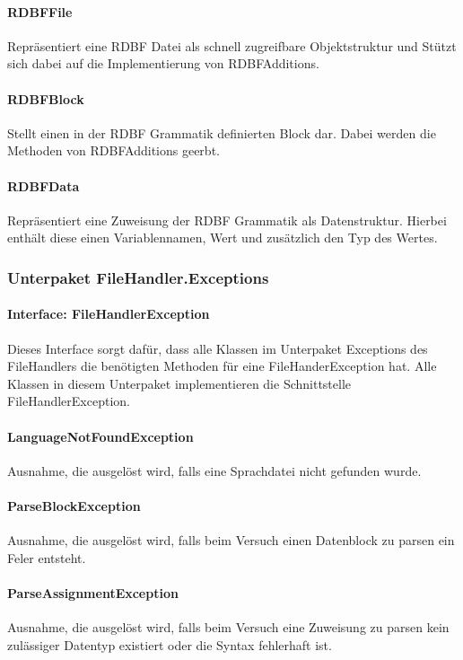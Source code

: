 \documentclass[parskip=full]{scrartcl}
\begin{document}
\paragraph{RDBFFile}
Repräsentiert eine RDBF Datei als schnell zugreifbare Objektstruktur und Stützt sich dabei auf die Implementierung von RDBFAdditions.
\paragraph{RDBFBlock}
Stellt einen in der RDBF Grammatik definierten Block dar. Dabei werden die Methoden von RDBFAdditions geerbt.
\paragraph{RDBFData}
Repräsentiert eine Zuweisung der RDBF Grammatik als Datenstruktur. Hierbei enthält diese einen Variablennamen, Wert und zusätzlich den Typ des Wertes.
\subsubsection{Unterpaket FileHandler.Exceptions}
\paragraph{Interface: FileHandlerException}
Dieses Interface sorgt dafür, dass alle Klassen im Unterpaket Exceptions des FileHandlers die benötigten Methoden für eine FileHanderException hat.
Alle Klassen in diesem Unterpaket implementieren die Schnittstelle FileHandlerException.
\paragraph{LanguageNotFoundException}
Ausnahme, die ausgelöst wird, falls eine Sprachdatei nicht gefunden wurde.
\paragraph{ParseBlockException}
Ausnahme, die ausgelöst wird, falls beim Versuch einen Datenblock zu parsen ein Feler entsteht.
\paragraph{ParseAssignmentException}
Ausnahme, die ausgelöst wird, falls beim Versuch eine Zuweisung zu parsen kein zulässiger Datentyp existiert oder die Syntax fehlerhaft ist.
\end{document}
